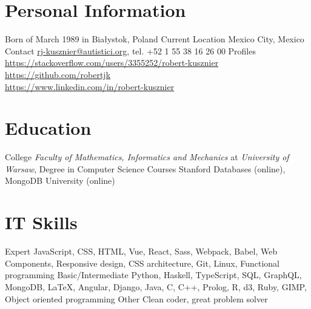 

\section{Personal Information}

\begin{sectionlist}
    \sectionlistitem
        {Born}
        { of March 1989 in Bia\l{}ystok, Poland}
    \sectionlistitem
        {Current Location}
        {Mexico City, Mexico}
    \sectionlistitem
        {Contact}
        {
            \href{mailto:rj-kusznier@autistici.org}{rj-kusznier@autistici.org},
            tel. +52 1 55 38 16 26 00
        }
    \sectionlistitem
        {Profiles}
        {
            \url{https://stackoverflow.com/users/3355252/robert-kusznier} \\
            \url{https://github.com/robertjk} \\
            \url{https://www.linkedin.com/in/robert-kusznier}
        }
\end{sectionlist}


\section{Education}

\begin{sectionlist}
    \sectionlistitem
        {College}
        {
            \emph{Faculty of Mathematics, Informatics and Mechanics} at
            \emph{University of Warsaw}, Degree in Computer
            Science
        }
    \sectionlistitem
        {Courses}
        {Stanford Databases (online), MongoDB University (online)}
\end{sectionlist}


\section{IT Skills}

\begin{sectionlist}
    \sectionlistitem
        {Expert}
        {
            JavaScript, CSS, HTML, Vue, React, Sass, Webpack, Babel, Web
            Components, Responsive design, CSS architecture, Git, Linux,
            Functional programming
        }
    \sectionlistitem
        {Basic/Intermediate}
        {
            Python, Haskell, TypeScript, SQL, GraphQL, MongoDB, \LaTeX, Angular,
            Django, Java, C, C++, Prolog, R, d3, Ruby, GIMP, Object oriented
            programming
        }
    \sectionlistitem
        {Other}
        {Clean coder, great problem solver}
\end{sectionlist}


